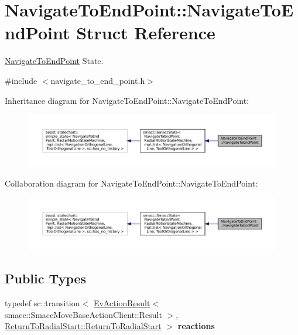 \hypertarget{structNavigateToEndPoint_1_1NavigateToEndPoint}{}\section{Navigate\+To\+End\+Point\+:\+:Navigate\+To\+End\+Point Struct Reference}
\label{structNavigateToEndPoint_1_1NavigateToEndPoint}


\hyperlink{structNavigateToEndPoint_1_1NavigateToEndPoint}{Navigate\+To\+End\+Point} State.  




{\ttfamily \#include $<$navigate\+\_\+to\+\_\+end\+\_\+point.\+h$>$}



Inheritance diagram for Navigate\+To\+End\+Point\+:\+:Navigate\+To\+End\+Point\+:
\nopagebreak
\begin{figure}[H]
\begin{center}
\leavevmode
\includegraphics[width=350pt]{structNavigateToEndPoint_1_1NavigateToEndPoint__inherit__graph}
\end{center}
\end{figure}


Collaboration diagram for Navigate\+To\+End\+Point\+:\+:Navigate\+To\+End\+Point\+:
\nopagebreak
\begin{figure}[H]
\begin{center}
\leavevmode
\includegraphics[width=350pt]{structNavigateToEndPoint_1_1NavigateToEndPoint__coll__graph}
\end{center}
\end{figure}
\subsection*{Public Types}
\begin{DoxyCompactItemize}
\item 
\mbox{\label{structNavigateToEndPoint_1_1NavigateToEndPoint_abc30168c31735908f4b06db0b2742762}} 
typedef sc\+::transition$<$ \hyperlink{structsmacc_1_1EvActionResult}{Ev\+Action\+Result}$<$ smacc\+::\+Smacc\+Move\+Base\+Action\+Client\+::\+Result $>$, \hyperlink{structReturnToRadialStart_1_1ReturnToRadialStart}{Return\+To\+Radial\+Start\+::\+Return\+To\+Radial\+Start} $>$ {\bfseries reactions}
\end{DoxyCompactItemize}
